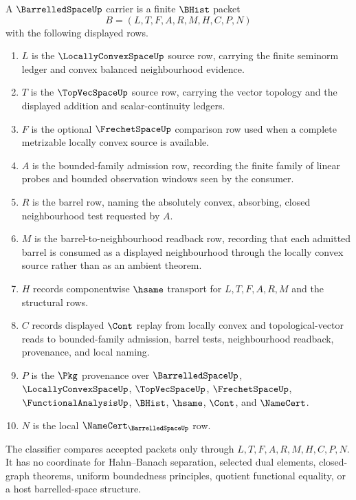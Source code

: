 \begin{definition}
\label{def:barrelled-space-carrier}
A $\BarrelledSpaceUp$ carrier is a finite $\BHist$ packet
$$
B=(L,T,F,A,R,M,H,C,P,N)
$$
with the following displayed rows.
\begin{enumerate}
\item $L$ is the $\LocallyConvexSpaceUp$ source row, carrying the finite seminorm ledger and convex balanced neighbourhood evidence.
\item $T$ is the $\TopVecSpaceUp$ source row, carrying the vector topology and the displayed addition and scalar-continuity ledgers.
\item $F$ is the optional $\FrechetSpaceUp$ comparison row used when a complete metrizable locally convex source is available.
\item $A$ is the bounded-family admission row, recording the finite family of linear probes and bounded observation windows seen by the consumer.
\item $R$ is the barrel row, naming the absolutely convex, absorbing, closed neighbourhood test requested by $A$.
\item $M$ is the barrel-to-neighbourhood readback row, recording that each admitted barrel is consumed as a displayed neighbourhood through the locally convex source rather than as an ambient theorem.
\item $H$ records componentwise $\hsame$ transport for $L,T,F,A,R,M$ and the structural rows.
\item $C$ records displayed $\Cont$ replay from locally convex and topological-vector reads to bounded-family admission, barrel tests, neighbourhood readback, provenance, and local naming.
\item $P$ is the $\Pkg$ provenance over $\BarrelledSpaceUp$, $\LocallyConvexSpaceUp$, $\TopVecSpaceUp$, $\FrechetSpaceUp$, $\FunctionalAnalysisUp$, $\BHist$, $\hsame$, $\Cont$, and $\NameCert$.
\item $N$ is the local $\NameCert_{\BarrelledSpaceUp}$ row.
\end{enumerate}
The classifier compares accepted packets only through $L,T,F,A,R,M,H,C,P,N$. It has no coordinate for Hahn--Banach separation, selected dual elements, closed-graph theorems, uniform boundedness principles, quotient functional equality, or a host barrelled-space structure.
\end{definition}

